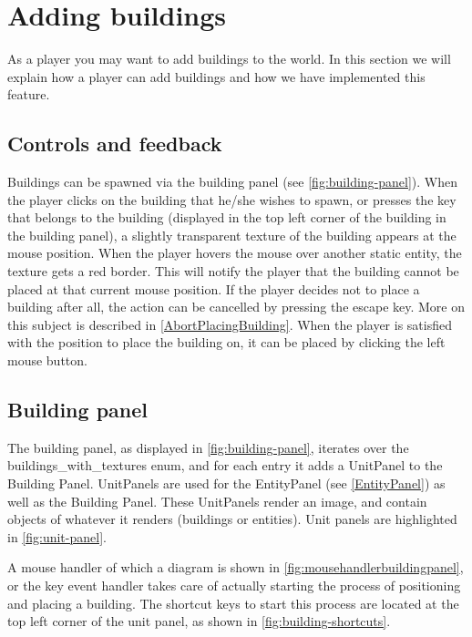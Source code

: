 \section{Adding buildings}
\label{sec:addingbuildings}
As a player you may want to add buildings to the world. In this section we will explain how a player can add buildings and how we have implemented this feature.

\subsection{Controls and feedback}
Buildings can be spawned via the building panel (see \cref{fig:building-panel}). When the player clicks on the building that he/she wishes to spawn, or presses the key that belongs to the building (displayed in the top left corner of the building in the building panel), a slightly transparent texture of the building appears at the mouse position. When the player hovers the mouse over another static entity, the texture gets a red border. This will notify the player that the building cannot be placed at that current mouse position. If the player decides not to place a building after all, the action can be cancelled by pressing the escape key. More on this subject is described in \cref{AbortPlacingBuilding}. When the player is satisfied with the position to place the building on, it can be placed by clicking the left mouse button. 

\subsection{Building panel}
The building panel, as displayed in \cref{fig:building-panel}, iterates over the buildings\_with\_textures enum, and for each entry it adds a UnitPanel to the Building Panel. UnitPanels are used for the EntityPanel (see \ref{EntityPanel}) as well as the Building Panel. These UnitPanels render an image, and contain objects of whatever it renders (buildings or entities). Unit panels are highlighted in \cref{fig:unit-panel}.

A mouse handler of which a diagram is shown in \cref{fig:mousehandlerbuildingpanel}, or the key event handler takes care of actually starting the process of positioning and placing a building. The shortcut keys to start this process are located at the top left corner of the unit panel, as shown in \cref{fig:building-shortcuts}.

